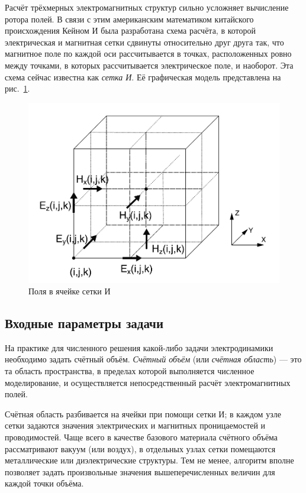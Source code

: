 Расчёт трёхмерных электромагнитных структур сильно усложняет вычисление ротора полей. В связи с этим американским математиком китайского происхождения Кейном И была разработана схема расчёта, в которой электрическая и магнитная сетки сдвинуты относительно друг друга так, что магнитное поле по каждой оси рассчитывается в точках, расположенных ровно между точками, в которых рассчитывается электрическое поле, и наоборот. Эта схема сейчас известна как \textit{сетка И}. Её графическая модель представлена на рис.~\ref{fig:YeeGrid}.

\begin{figure}[p]
\centering
\includegraphics[width=1\textwidth]{include/graphics/image1}
\caption{Поля в ячейке сетки И}
\label{fig:YeeGrid}
\end{figure}

\subsection{Входные параметры задачи}

На практике для численного решения какой-либо задачи электродинамики необходимо задать счётный объём. \textit{Счётный объём} (или \textit{счётная область}) --- это та область пространства, в пределах которой выполняется численное моделирование, и осуществляется непосредственный расчёт электромагнитных полей.

Счётная область разбивается на ячейки при помощи сетки И; в каждом узле сетки задаются значения электрических и магнитных проницаемостей и проводимостей. Чаще всего в качестве базового материала счётного объёма рассматривают вакуум (или воздух), в отдельных узлах сетки помещаются металлические или диэлектрические структуры. Тем не менее, алгоритм вполне позволяет задать произвольные значения вышеперечисленных величин для каждой точки объёма.

